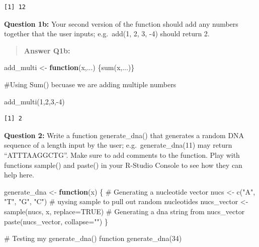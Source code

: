 \documentclass[
  letterpaper,
  DIV=11,
  numbers=noendperiod]{scrartcl}
\newenvironment{Shaded}{\begin{snugshade}}{\end{snugshade}}
\newcommand{\AttributeTok}[1]{\textcolor[rgb]{0.40,0.45,0.13}{#1}}
\newcommand{\CommentTok}[1]{\textcolor[rgb]{0.37,0.37,0.37}{#1}}
\newcommand{\ConstantTok}[1]{\textcolor[rgb]{0.56,0.35,0.01}{#1}}
\newcommand{\ControlFlowTok}[1]{\textcolor[rgb]{0.00,0.23,0.31}{\textbf{#1}}}
\newcommand{\DecValTok}[1]{\textcolor[rgb]{0.68,0.00,0.00}{#1}}
\newcommand{\FunctionTok}[1]{\textcolor[rgb]{0.28,0.35,0.67}{#1}}
\newcommand{\NormalTok}[1]{\textcolor[rgb]{0.00,0.23,0.31}{#1}}
\newcommand{\OtherTok}[1]{\textcolor[rgb]{0.00,0.23,0.31}{#1}}
\newcommand{\SpecialCharTok}[1]{\textcolor[rgb]{0.37,0.37,0.37}{#1}}
\newcommand{\StringTok}[1]{\textcolor[rgb]{0.13,0.47,0.30}{#1}}
\begin{document}
\begin{verbatim}
[1] 12
\end{verbatim}

\textbf{Question 1b:} Your second version of the function should add any
numbers together that the user inputs; e.g.~add(1, 2, 3, -4) should
return 2.

\begin{quote}
\textbf{Answer Q1b:}
\end{quote}

\begin{Shaded}
\begin{Highlighting}[]
\NormalTok{add\_multi }\OtherTok{\textless{}{-}} \ControlFlowTok{function}\NormalTok{(x,...) }
\NormalTok{\{}\FunctionTok{sum}\NormalTok{(x,...)\}}

 \CommentTok{\#Using Sum() becuase we are adding multiple numbers }

\FunctionTok{add\_multi}\NormalTok{(}\DecValTok{1}\NormalTok{,}\DecValTok{2}\NormalTok{,}\DecValTok{3}\NormalTok{,}\SpecialCharTok{{-}}\DecValTok{4}\NormalTok{)}
\end{Highlighting}
\end{Shaded}

\begin{verbatim}
[1] 2
\end{verbatim}

\textbf{Question 2:} Write a function generate\_dna() that generates a
random DNA sequence of a length input by the user;
e.g.~generate\_dna(11) may return ``ATTTAAGGCTG''. Make sure to add
comments to the function. Play with functions sample() and paste() in
your R-Studio Console to see how they can help here.

\begin{Shaded}
\begin{Highlighting}[]
\NormalTok{generate\_dna }\OtherTok{\textless{}{-}} \ControlFlowTok{function}\NormalTok{(x) \{}
  \CommentTok{\# Generating a nucleotide vector }
\NormalTok{  nucs }\OtherTok{\textless{}{-}} \FunctionTok{c}\NormalTok{(}\StringTok{"A"}\NormalTok{, }\StringTok{"T"}\NormalTok{, }\StringTok{"G"}\NormalTok{, }\StringTok{"C"}\NormalTok{)}
  \CommentTok{\# uysing sample to pull out random nucleotides}
\NormalTok{  nucs\_vector }\OtherTok{\textless{}{-}} \FunctionTok{sample}\NormalTok{(nucs, x, }\AttributeTok{replace=}\ConstantTok{TRUE}\NormalTok{)}
  \CommentTok{\# Generating a dna string from nucs\_vector}
  \FunctionTok{paste}\NormalTok{(nucs\_vector, }\AttributeTok{collapse=}\StringTok{""}\NormalTok{)}
\NormalTok{\}}

\CommentTok{\# Testing my generate\_dna() function}
\FunctionTok{generate\_dna}\NormalTok{(}\DecValTok{34}\NormalTok{)}
\end{Highlighting}
\end{Shaded}
\end{document}
